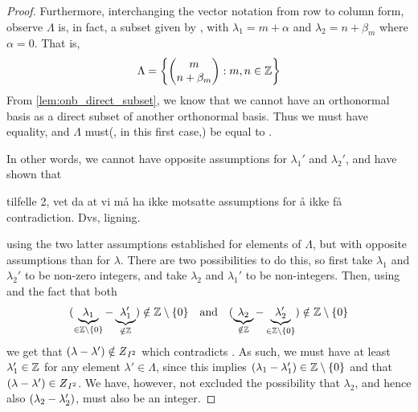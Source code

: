 \documentclass[../thesis.tex]{subfiles}
\begin{document}
\begin{proof}
    Furthermore, interchanging the vector notation from row to column form, observe $\Lambda$ is, in fact, a subset given by , with $\lambda_1 = m + \alpha$ and $\lambda_2 = n+\beta_m$ where $\alpha = 0$. That is,
    \begin{equation*}
        \Lambda = \left\{\begin{pmatrix} m \\ n+\beta_m\end{pmatrix} : m,n \in \mathbb{Z}\right\} 
    \end{equation*} %
    From \cref{lem:onb_direct_subset}, we know that we cannot have an orthonormal basis as a direct subset of another orthonormal basis. Thus we must have equality, and $\Lambda$ must(, in this first case,) be equal to .

    
    
    In other words, we cannot have opposite assumptions for $\lambda_1'$ and $\lambda_2'$, and have shown that 

    tilfelle 2, vet da at vi må ha ikke motsatte assumptions for å ikke få contradiction. Dvs, 
    ligning. 
    


    
    using the two latter assumptions established for elements of $\Lambda$, but with opposite assumptions than for $\lambda$. There are two possibilities to do this, so first take $\lambda_1$ and $\lambda_2'$ to be non-zero integers, and take $\lambda_2$ and $\lambda_1'$ to be non-integers. Then, using   and the fact that both 
    \begin{align*}
        (\underbrace{\lambda_1}_{\in \mathbb{Z}\setminus\{0\}}-\underbrace{\lambda_1'}_{\notin \mathbb{Z}}) \notin \mathbb{Z}\setminus\{0\}
        \quad \text{and} \quad
        (\underbrace{\lambda_2}_{\notin \mathbb{Z}}-\underbrace{\lambda_2'}_{\in \mathbb{Z}\setminus\{0\}}) \notin \mathbb{Z}\setminus\{0\}
    \end{align*}
    we get that $\brac{\lambda-\lambda'} \notin \Zstroke_{I^2}$ which contradicts . As such, we must have at least $\lambda_1'\in \mathbb{Z}$ for any element $\lambda'\in \Lambda$, since this implies $(\lambda_1 - \lambda_1')\in \mathbb{Z}\setminus\{0\}$ and that $\brac{\lambda-\lambda'} \in \Zstroke_{I^2}$. We have, however, not excluded the possibility that $\lambda_2$, and hence also $(\lambda_2 - \lambda_2')$, must also be an integer.




\end{proof}
\end{document}
